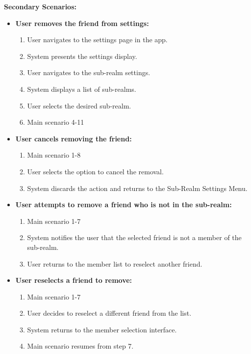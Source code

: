\documentclass{article}
\begin{document}
\begin{enumerate}[label=\textbf{UC\arabic*}]
        \textbf{Secondary Scenarios:}
        \begin{itemize}
            \item[{}] \textbf{User removes the friend from settings:}
            \begin{enumerate}[label=\textbf{\arabic*.}]
                \item User navigates to the settings page in the app.
                \item System presents the settings display.
                \item User navigates to the sub-realm settings.
                \item System displays a list of sub-realms.
                \item User selects the desired sub-realm.
                \item Main scenario 4-11
            \end{enumerate}
            
            \item[{}] \textbf{User cancels removing the friend:}
            \begin{enumerate}[label=\textbf{\arabic*.}]
                \item Main scenario 1-8
                \item User selects the option to cancel the removal.
                \item System discards the action and returns to the Sub-Realm Settings Menu.
            \end{enumerate}
            
            \item[{}] \textbf{User attempts to remove a friend who is not in the sub-realm:}
            \begin{enumerate}[label=\textbf{\arabic*.}]
                \item Main scenario 1-7
                \item System notifies the user that the selected friend is not a member of the sub-realm.
                \item User returns to the member list to reselect another friend.
            \end{enumerate}
            
            \item[{}] \textbf{User reselects a friend to remove:}
            \begin{enumerate}[label=\textbf{\arabic*.}]
                \item Main scenario 1-7
                \item User decides to reselect a different friend from the list.
                \item System returns to the member selection interface.
                \item Main scenario resumes from step 7.
            \end{enumerate}
        \end{itemize}
        

\end{enumerate}
\end{document}
